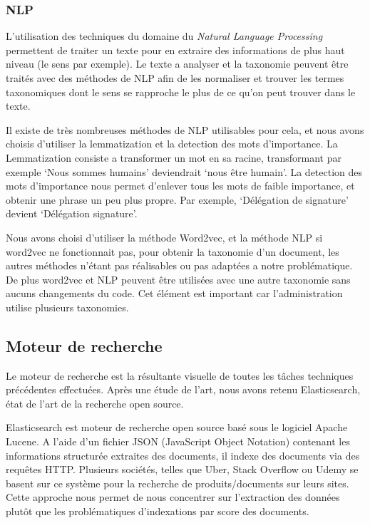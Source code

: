\subsubsection{NLP}
L'utilisation des techniques du domaine du \textit{Natural Language Processing} permettent de traiter un texte pour en extraire des informations de plus haut niveau (le sens par exemple).
Le texte a analyser et la taxonomie peuvent être traités avec des méthodes de NLP afin de les normaliser et trouver les termes taxonomiques dont le sens se rapproche le plus de ce qu'on peut trouver dans le texte.

Il existe de très nombreuses méthodes de NLP utilisables pour cela, et nous avons choisis d'utiliser la lemmatization et la detection des mots d'importance.
La Lemmatization consiste a transformer un mot en sa racine, transformant par exemple `Nous sommes humains' deviendrait `nous être humain'.
La detection des mots d'importance nous permet d'enlever tous les mots de faible importance, et obtenir une phrase un peu plus propre.
Par exemple, `Délégation de signature' devient `Délégation signature'.


Nous avons choisi d'utiliser la méthode Word2vec, et la méthode NLP si word2vec ne fonctionnait pas, pour obtenir la taxonomie d'un document, les autres méthodes n'étant pas réalisables ou pas adaptées a notre problématique.
De plus word2vec et NLP peuvent être utilisées avec une autre taxonomie sans aucuns changements du code.
Cet élément est important car l'administration utilise plusieurs taxonomies. 


\subsection{Moteur de recherche}
Le moteur de recherche est la résultante visuelle de toutes les tâches techniques précédentes effectuées.
Après une étude de l’art, nous avons retenu Elasticsearch, état de l'art de la recherche open source.

Elasticsearch est moteur de recherche open source basé sous le logiciel Apache Lucene.
A l’aide d’un fichier JSON (JavaScript Object Notation) contenant les informations structurée extraites des documents, il indexe des documents via des requêtes HTTP\@.
Plusieurs sociétés, telles que Uber, Stack Overflow ou Udemy se basent sur ce système pour la recherche de produits/documents sur leurs sites. 
Cette approche nous permet de nous concentrer sur l'extraction des données plutôt que les problématiques d’indexations par score des documents.

